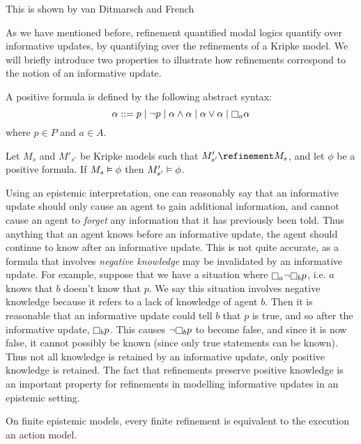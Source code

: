 This is shown by van Ditmarsch and French~\cite{french2009simulation}

As we have mentioned before, refinement quantified modal logics quantify over
informative updates, by quantifying over the refinements of a Kripke model. We
will briefly introduce two properties to illustrate how refinements correspond
to the notion of an informative update.

\begin{definition}
A positive formula is defined by the following abstract syntax:
$$
\alpha ::=    p \bnfalt 
            \neg p \bnfalt
            \alpha \land \alpha \bnfalt
            \alpha \lor \alpha \bnfalt
            \knows_a \alpha
$$
where $p \in P$ and $a \in A$.
\end{definition}

\begin{proposition}\label{pre-positive}
Let $M_s$ and $M'_{s'}$ be Kripke models such that $M'_{s'} \refinement M_s$,
and let $\phi$ be a positive formula. If $M_s \vDash \phi$ then $M'_{s'}
\vDash \phi$. 
\end{proposition}

Using an epistemic interpretation, one can reasonably say that an informative
update should only cause an agent to gain additional information, and cannot
cause an agent to {\em forget} any information that it has previously been told.
Thus anything that an agent knows before an informative update, the agent should
continue to know after an informative update. This is not quite accurate, as a
formula that involves {\em negative knowledge} may be invalidated by an
informative update. For example, suppose that we have a situation where
$\knows_a \neg \knows_b p$, i.e. $a$ knows that $b$ doesn't know that $p$. We
say this situation involves negative knowledge because it refers to a lack of
knowledge of agent $b$. Then it is reasonable that an informative update could
tell $b$ that $p$ is true, and so after the informative update, $\knows_b p$.
This causes $\neg \knows_b p$ to become false, and since it is now false, it
cannot possibly be known (since only true statements can be known). Thus not all
knowledge is retained by an informative update, only positive knowledge is
retained. The fact that refinements preserve positive knowledge is an important
property for refinements in modelling informative updates in an epistemic
setting.

\begin{proposition}
On finite epistemic models, every finite refinement is equivalent to the
execution an action model.
\end{proposition}

